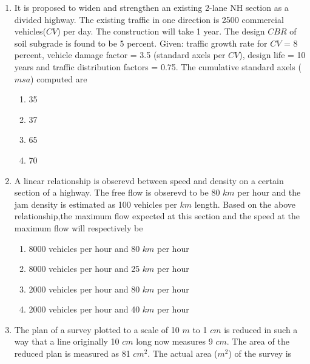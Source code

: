 \documentclass[journal]{IEEEtran}
\begin{document}
\begin{enumerate}
\begin{multicols}{2}
\begin{enumerate}
		\item decrease for both the roads
		\item remain unchanged for both the roads
	\end{enumerate}
\end{multicols}
	\item It is proposed to widen and strengthen an existing 2-lane NH section as a divided highway. The existing traffic in one direction is 2500 commercial vehicles($CV$) per day. The construction will take 1 year. The design $CBR$ of soil subgrade is found to be 5 percent. Given: traffic growth rate for $CV$ = 8 percent, vehicle damage factor = 3.5 (standard axels per $CV$), design life = 10 years and traffic distribution factors = 0.75. The cumulative standard axels ($msa$) computed are
\begin{multicols}{2}
	\begin{enumerate}
		\item 35
		\item 37
		\item 65
		\item 70
	\end{enumerate}
\end{multicols}	
	\item A linear relationship is obserevd between speed and density on a certain section of a highway. The free flow is obserevd to be 80 $km$ per hour and the jam density is estimated as 100 vehicles per $km$ length. Based on the above relationship,the maximum flow expected at this section and the speed at the maximum flow will respectively be
\begin{multicols}{2}
	\begin{enumerate}
		\item 8000 vehicles per hour and 80 $km$ per hour
		\item 8000 vehicles per hour and 25 $km$ per hour
		\item 2000 vehicles per hour and 80 $km$ per hour
		\item 2000 vehicles per hour and 40 $km$ per hour
	\end{enumerate}
\end{multicols}	
	\item The plan of a survey plotted to a scale of 10 $m$ to 1 $cm$ is reduced in such a way that a line originally 10 $cm$ long now measures 9 $cm$. The area of the reduced plan is measured as 81 $cm^2$. The actual area ($m^2$) of the survey is
\begin{multicols}{2}
	\begin{enumerate}

\end{enumerate}
\end{multicols}
\end{enumerate}
\end{document}
